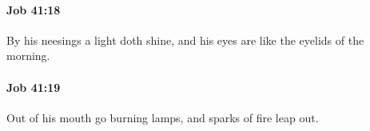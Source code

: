 		\paragraph{Job 41:18} %
			\label{JOB-41-18}

			By his neesings a light doth shine, and his eyes are like the eyelids of the morning.


		\paragraph{Job 41:19} %
			\label{JOB-41-19}

			Out of his mouth go burning lamps, and sparks of fire leap out.


